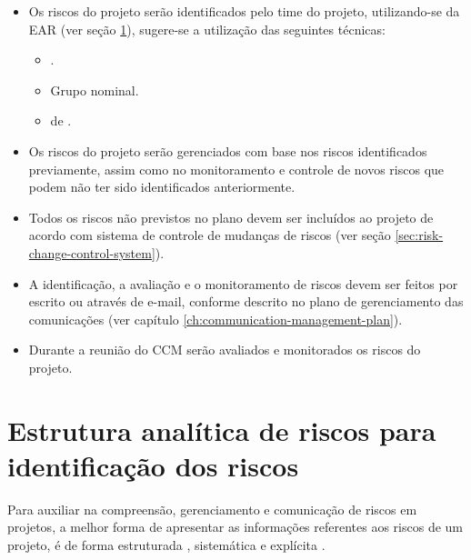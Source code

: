 \begin{itemize}
\item Os riscos do projeto serão identificados pelo time do projeto, utilizando-se da EAR (ver seção \ref{sec:rbs}), sugere-se a utilização das seguintes técnicas:
\begin{itemize} 
\item {}. 
\item Grupo nominal. 
\item {} de .
\end{itemize} 
\item Os riscos do projeto serão gerenciados com base nos riscos identificados previamente, assim como no monitoramento e controle de novos riscos que podem não ter sido identificados anteriormente.
\item Todos os riscos não previstos no plano devem ser incluídos ao projeto de acordo com sistema de controle de mudanças de riscos (ver seção \ref{sec:risk-change-control-system}).
\item A identificação, a avaliação e o monitoramento de riscos devem ser feitos por escrito ou através de e-mail, conforme descrito no plano de gerenciamento das comunicações (ver capítulo \ref{ch:communication-management-plan}).
\item Durante a reunião do CCM serão avaliados e monitorados os riscos do projeto.
\end{itemize}

\section{Estrutura analítica de riscos para identificação dos riscos}
\label{sec:rbs}

Para auxiliar na compreensão, gerenciamento e comunicação de riscos em projetos, a melhor forma de apresentar as informações referentes aos riscos de um projeto, é de forma estruturada \cite{hillson2002risk}, sistemática e explícita \cite{gusmao2007modelo}.

